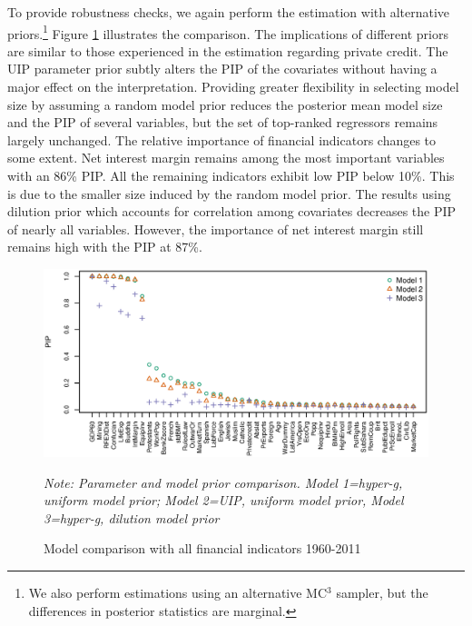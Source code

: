 \begin{refsection}
To provide robustness checks, we again perform the estimation with alternative priors.\footnote{We also perform estimations using an alternative MC$^{3}$ sampler, but the differences in posterior statistics are marginal.} Figure \ref{ch2fig:compall60} illustrates the comparison. The implications of different priors are similar to those experienced in the estimation regarding private credit. The \ac{UIP} parameter prior subtly alters the \ac{PIP} of the covariates without having a major effect on the interpretation. Providing greater flexibility in selecting model size by assuming a random model prior reduces the posterior mean model size and the \ac{PIP} of several variables, but the set of top-ranked regressors remains largely unchanged. The relative importance of financial indicators changes to some extent. Net interest margin remains among the most important variables with an 86\% \ac{PIP}. All the remaining indicators exhibit low \ac{PIP} below 10\%. This is due to the smaller size induced by the random model prior. The results using dilution prior which accounts for correlation among covariates decreases the \ac{PIP} of nearly all variables. However, the importance of net interest margin still remains high with the \ac{PIP} at 87\%.
\begin{figure}[!ht]
	\centering
	\caption{Model comparison with all financial indicators 1960-2011}
		\label{ch2fig:compall60}
		\includegraphics[width=\linewidth]{Figures/ch2/plotCompall6011}
		\begin{minipage}{0.8\textwidth}
			\footnotesize
			\emph{Note: Parameter and model prior comparison. Model 1=hyper-g, uniform model prior; Model 2=\ac{UIP}, uniform model prior, Model 3=hyper-g, dilution model prior}
		  \end{minipage}
\end{figure}


\end{refsection}
